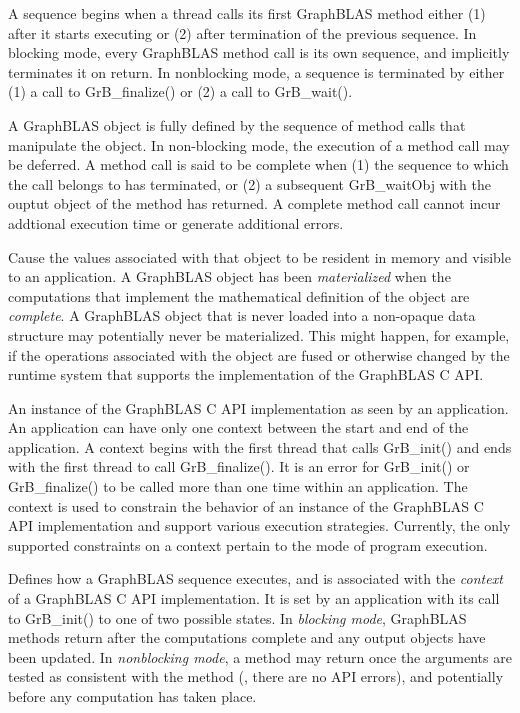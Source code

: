 A sequence begins when a thread calls its first GraphBLAS method either
(1) after it starts executing or (2) after termination of the previous
sequence.  In blocking mode, every GraphBLAS method call is its own
sequence, and implicitly terminates it on return.  In nonblocking mode,
a sequence is terminated by either (1) a call to {\sf GrB\_finalize()}
or (2) a call to {\sf GrB\_wait()}.

 A GraphBLAS object is fully defined by the sequence
of method calls that manipulate the object.  In non-blocking mode,
the execution of a method call may be deferred.  A method call is said
to be complete when (1) the sequence to which the call belongs to has
terminated, or (2) a subsequent {\sf GrB\_waitObj} with the ouptut object
of the method has returned. A complete method call cannot incur
addtional execution time or generate additional errors.

 Cause the values associated with that object to be resident 
in memory and visible to an application.  A GraphBLAS object has been 
\emph{materialized} when the computations that implement the mathematical definition 
of the object are {\it complete}. 
A GraphBLAS object that is never loaded into a non-opaque data structure may 
potentially never be materialized.  This might happen, for example, if the operations 
associated with the object are fused or otherwise changed by the runtime system 
that supports the implementation of the GraphBLAS C API.   

  An instance of the GraphBLAS C API implementation
as seen by an application.  An application can have only one context between the 
start and end of the application.  
A context begins with the first thread that calls {\sf GrB\_init()} and ends with the 
first thread to call {\sf GrB\_finalize()}.  
It is an error for {\sf GrB\_init()} or {\sf GrB\_finalize()} to be called more than one
time within an application.  The context is used to constrain the behavior of an
instance of the GraphBLAS C API implementation and support various execution strategies.
Currently, the only
supported constraints on a context pertain to the mode of program execution.

 Defines how a GraphBLAS sequence executes, and is associated 
with the {\it context} of a GraphBLAS C API implementation. It is set by an 
application with its call to {\sf GrB\_init()} to one of two possible states.  
In \emph{blocking mode}, GraphBLAS methods return after the computations 
complete and any output objects have been updated.  In {\it nonblocking mode}, a 
method may return once the arguments are tested as consistent with 
the method (\ie, there are no API errors), and potentially before any computation 
has taken place.
\glossEnd

